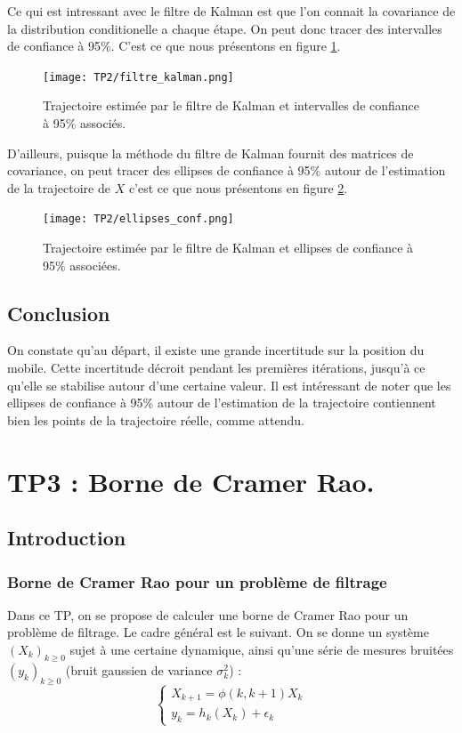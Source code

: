 \documentclass{article}
\begin{document}
Ce qui est intressant avec le filtre de Kalman est que l'on connait la covariance de la distribution
conditionelle a chaque étape. On peut donc tracer des 
intervalles de confiance à 95\%. C'est ce que nous présentons en figure \ref{ellipse}.

\begin{figure}[!htb]
   \centering
   \caption{Trajectoire estimée par le filtre de Kalman et intervalles de confiance à 95\% associés.}
   \label{ellipse}
   \texttt{[image: TP2/filtre\_kalman.png]}
\end{figure}

D'ailleurs, puisque la méthode du filtre de Kalman fournit des matrices de covariance, on 
peut tracer des ellipses de confiance à 95\% autour de l'estimation de la trajectoire
de $X$ c'est ce que nous présentons en figure \ref{ellipse_conf}. 

\begin{figure}[!htb]
   \centering
   \caption{Trajectoire estimée par le filtre de Kalman et ellipses de confiance à 95\% associées.}
   \label{ellipse_conf}
   \texttt{[image: TP2/ellipses\_conf.png]}
\end{figure}
\subsection{Conclusion}

On constate qu'au départ, il existe une grande incertitude sur la position du mobile.
Cette incertitude décroit pendant les premières itérations, jusqu'à ce qu'elle se stabilise autour d'une certaine valeur.
Il est intéressant de noter que les ellipses de confiance à 95\% autour de 
l'estimation de la trajectoire contiennent bien les points de la trajectoire réelle,
comme attendu.




\clearpage


\section{TP3 : Borne de Cramer Rao.}
\subsection{Introduction}
\subsubsection{Borne de Cramer Rao pour un problème de filtrage}

Dans ce TP, on se propose de calculer une borne de Cramer Rao pour un problème de filtrage. Le cadre général est le suivant.
On se donne un système  $(X_{k})_{k\geq 0}$ sujet à une certaine dynamique,
ainsi qu'une série de mesures bruitées $(y_{k})_{k \geq 0}$ (bruit gaussien de variance $\sigma_{k}^{2}$) : 
\[\left\{\begin{array}{ll}
   X_{k+1} = \phi(k,k+1)X_{k} \\
   y_{k}=h_{k}(X_{k})+\epsilon_{k}
\end{array}\right. \]
\end{document}
